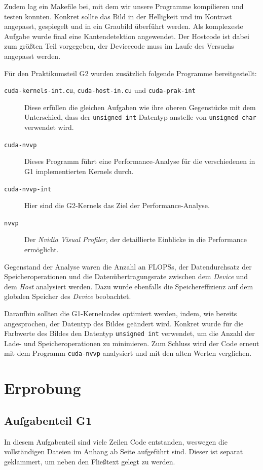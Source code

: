 \documentclass[12pt,a4paper]{scrartcl}
\begin{document}
Zudem lag ein Makefile bei, mit dem wir unsere Programme kompilieren und testen konnten.
Konkret sollte das Bild in der Helligkeit und im Kontrast angepasst, gespiegelt und in ein Graubild \"uberf\"uhrt werden.
Als komplexeste Aufgabe wurde final eine Kantendetektion angewendet.
Der Hostcode ist dabei zum gr\"o\ss ten Teil vorgegeben, der Devicecode muss im Laufe des Versuchs angepasst werden.

F\"ur den Praktikumsteil G2 wurden zus\"atzlich folgende Programme bereitgestellt:

\begin{description}
    \item [\texttt{cuda-kernels-int.cu}, \texttt{cuda-host-in.cu} und \texttt{cuda-prak-int}] Diese erf\"ullen die gleichen Aufgaben wie ihre oberen Gegenst\"ucke mit dem Unterschied, dass der \texttt{unsigned int}-Datentyp anstelle von \texttt{unsigned char} verwendet wird.
    \item [\texttt{cuda-nvvp}] Dieses Programm f\"uhrt eine Performance-Analyse f\"ur die verschiedenen in G1 implementierten Kernels durch.
    \item [\texttt{cuda-nvvp-int}] Hier sind die G2-Kernels das Ziel der Performance-Analyse.
    \item [\texttt{nvvp}] Der \emph{Nvidia Visual Profiler}, der detaillierte Einblicke in die Performance erm\"oglicht.
\end{description}

Gegenstand der Analyse waren die Anzahl an FLOPSs, der Datendurchsatz der Speicheroperationen und die Daten\"ubertragungsrate zwischen dem \textit{Device} und dem \textit{Host} analysiert werden.
Dazu wurde ebenfalls die Speichereffizienz auf dem globalen Speicher des \textit{Device} beobachtet.

Daraufhin sollten die G1-Kernelcodes optimiert werden, indem, wie bereits angesprochen, der Datentyp des Bildes ge\"andert wird.
Konkret wurde f\"ur die Farbwerte des Bildes den Datentyp \texttt{unsigned int} verwendet, um die Anzahl der Lade- und Speicheroperationen zu minimieren.
Zum Schluss wird der Code erneut mit dem Programm \texttt{cuda-nvvp} analysiert und mit den alten Werten verglichen.


\section{Erprobung}

\subsection{Aufgabenteil G1}
In diesem Aufgabenteil sind viele Zeilen Code entstanden, weswegen die vollst\"andigen Dateien im Anhang ab Seite \pageref{anhang} aufgef\"uhrt sind.
Dieser ist separat geklammert, um neben den Flie\ss{}text gelegt zu werden.
\end{document}
